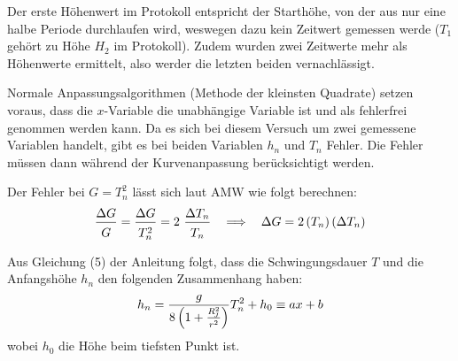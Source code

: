         Der erste Höhenwert im Protokoll entspricht der Starthöhe, von der aus nur eine halbe Periode durchlaufen wird, weswegen dazu kein Zeitwert gemessen werde ($T_1$ gehört zu Höhe $H_2$ im Protokoll). Zudem wurden zwei Zeitwerte mehr als Höhenwerte ermittelt, also werder die letzten beiden vernachlässigt.

        Normale Anpassungsalgorithmen (Methode der kleinsten Quadrate) setzen voraus, dass die $x$-Variable die unabhängige Variable ist und als fehlerfrei genommen werden kann. Da es sich bei diesem Versuch um zwei gemessene Variablen handelt, gibt es bei beiden Variablen $h_n$ und $T_n$ Fehler. Die Fehler müssen dann während der Kurvenanpassung berücksichtigt werden. 

        Der Fehler bei $G = T_n^2$ lässt sich laut AMW wie folgt berechnen:
        \begin{equation} 
            \frac{\Delta G}{\rule{0pt}{1em} G} = \frac{\Delta G}{\rule{0pt}{1em} T_n^2} = 2~\frac{\Delta T_n}{\rule{0pt}{1em} T_n} ~~\implies~~ \Delta G = 2 \left(T_n\right) \left(\Delta T_n\right)
        \end{equation}

        Aus Gleichung (5) der Anleitung folgt, dass die Schwingungsdauer $T$ und die Anfangshöhe $h_n$ den folgenden Zusammenhang haben:
        \begin{equation}
            h_n = \frac{g}{8\left(1+\frac{R_{\!J}^2}{\rule{0pt}{0.7em}r^2}\right)} T_n^2 + h_0 \equiv ax + b \label{eqn:hn}
        \end{equation}
        wobei $h_0$ die Höhe beim tiefsten Punkt ist.

